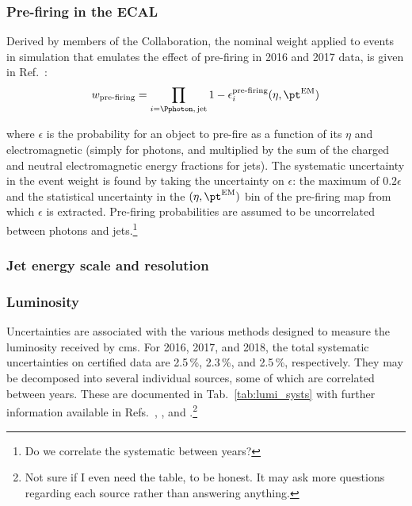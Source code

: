 

\subsubsection{Pre-firing in the ECAL}
\label{subsubsec:htoinv_ecal_prefiring_weight}

Derived by members of the Collaboration, the nominal weight applied to events in simulation that emulates the effect of pre-firing in 2016 and 2017 data, is given in Ref.~:
\begin{equation}
    w_{\text{pre-firing}} = \prod_{i = \Pphoton,\, \mathrm{jet}} 1 - \epsilon_i^{\text{pre-firing}}(\eta, \pt^{\mathrm{EM}})
    \label{eq:prefiring_weight}
\end{equation}

where $\epsilon$ is the probability for an object to pre-fire as a function of its $\eta$ and electromagnetic \pt (simply \pt for photons, and \pt multiplied by the sum of the charged and neutral electromagnetic energy fractions for \glspl{jet}). The systematic uncertainty in the event weight is found by taking the uncertainty on $\epsilon$: the maximum of $\text{0.2}\epsilon$ and the statistical uncertainty in the $(\eta, \pt^{\mathrm{EM}})$ bin of the pre-firing map from which $\epsilon$ is extracted. Pre-firing probabilities are assumed to be uncorrelated between photons and jets.\footnote{Do we correlate the systematic between years?}




\subsubsection{Jet energy scale and resolution}
\label{subsubsec:htoinv_JES_JER_systs}




\subsubsection{Luminosity}
\label{subsubsec:htoinv_lumi_syst}

Uncertainties are associated with the various methods designed to measure the luminosity received by \acrshort{cms}. For 2016, 2017, and 2018, the total systematic uncertainties on certified data are 2.5\,\%, 2.3\,\%, and 2.5\,\%, respectively. They may be decomposed into several individual sources, some of which are correlated between years. These are documented in Tab.~\ref{tab:lumi_systs} with further information available in Refs.~, , and .\footnote{Not sure if I even need the table, to be honest. It may ask more questions regarding each source rather than answering anything.}

